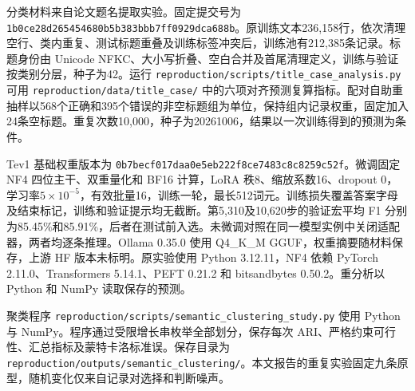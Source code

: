 \documentclass[UTF8,a4paper,zihao=-4,fontset=fandol]{ctexart}
\begin{document}
分类材料来自论文题名提取实验\citep{title-case}。固定提交号为 \nolinkurl{1b0ce28d265454680b5b383bbb7ff0929dca688b}。原训练文本236,158行，依次清理空行、类内重复、测试标题重叠及训练标签冲突后，训练池有212,385条记录。标题身份由 Unicode NFKC、大小写折叠、空白合并及首尾清理定义，训练与验证按类别分层，种子为42。运行 \nolinkurl{reproduction/scripts/title_case_analysis.py} 可用 \nolinkurl{reproduction/data/title_case/} 中的六项对齐预测复算指标。配对自助重抽样以568个正确和395个错误的非空标题组为单位，保持组内记录权重，固定加入24条空标题。重复次数10,000，种子为20261006，结果以一次训练得到的预测为条件。

Tev1 基础权重版本为 \nolinkurl{0b7becf017daa0e5eb222f8ce7483c8c8259c52f}。微调固定 NF4 四位主干、双重量化和 BF16 计算，LoRA 秩8、缩放系数16、dropout 0，学习率$5\times10^{-5}$，有效批量16，训练一轮，最长512词元。训练损失覆盖答案字母及结束标记，训练和验证提示均无截断。第5,310及10,620步的验证宏平均 F1 分别为85.45\%和85.91\%，后者在测试前入选。未微调对照在同一模型实例中关闭适配器，两者均逐条推理。Ollama 0.35.0 使用 Q4\_K\_M GGUF，权重摘要随材料保存，上游 HF 版本未标明。原实验使用 Python 3.12.11，NF4 依赖 PyTorch 2.11.0、Transformers 5.14.1、PEFT 0.21.2 和 bitsandbytes 0.50.2。重分析以 Python 和 NumPy 读取保存的预测。

聚类程序 \nolinkurl{reproduction/scripts/semantic_clustering_study.py} 使用 Python 与 NumPy。程序通过受限增长串枚举全部划分，保存每次 ARI、严格约束可行性、汇总指标及蒙特卡洛标准误。保存目录为 \nolinkurl{reproduction/outputs/semantic_clustering/}。本文报告的重复实验固定九条原型，随机变化仅来自记录对选择和判断噪声。
\end{document}

